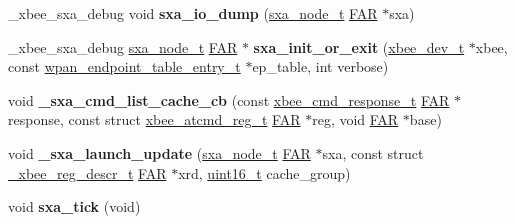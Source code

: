 \begin{DoxyCompactItemize}
\item 
\hypertarget{group___s_x_a_ga698650d3afb6074ef65c9bccf846f471}{\-\_\-xbee\-\_\-sxa\-\_\-debug void {\bfseries sxa\-\_\-io\-\_\-dump} (\hyperlink{structsxa__node__t}{sxa\-\_\-node\-\_\-t} \hyperlink{group__hal_gaef060b3456fdcc093a7210a762d5f2ed}{F\-A\-R} $\ast$sxa)}\label{group___s_x_a_ga698650d3afb6074ef65c9bccf846f471}

\item 
\hypertarget{group___s_x_a_ga20be2a68c0403ec05230526554ffc1ae}{\-\_\-xbee\-\_\-sxa\-\_\-debug \hyperlink{structsxa__node__t}{sxa\-\_\-node\-\_\-t} \hyperlink{group__hal_gaef060b3456fdcc093a7210a762d5f2ed}{F\-A\-R} $\ast$ {\bfseries sxa\-\_\-init\-\_\-or\-\_\-exit} (\hyperlink{structxbee__dev__t}{xbee\-\_\-dev\-\_\-t} $\ast$xbee, const \hyperlink{structwpan__endpoint__table__entry__t}{wpan\-\_\-endpoint\-\_\-table\-\_\-entry\-\_\-t} $\ast$ep\-\_\-table, int verbose)}\label{group___s_x_a_ga20be2a68c0403ec05230526554ffc1ae}

\item 
\hypertarget{group___s_x_a_ga7b3fb6046bd92a9d898403451f524737}{void {\bfseries \-\_\-sxa\-\_\-cmd\-\_\-list\-\_\-cache\-\_\-cb} (const \hyperlink{structxbee__cmd__response__t}{xbee\-\_\-cmd\-\_\-response\-\_\-t} \hyperlink{group__hal_gaef060b3456fdcc093a7210a762d5f2ed}{F\-A\-R} $\ast$response, const struct \hyperlink{structxbee__atcmd__reg__t}{xbee\-\_\-atcmd\-\_\-reg\-\_\-t} \hyperlink{group__hal_gaef060b3456fdcc093a7210a762d5f2ed}{F\-A\-R} $\ast$reg, void \hyperlink{group__hal_gaef060b3456fdcc093a7210a762d5f2ed}{F\-A\-R} $\ast$base)}\label{group___s_x_a_ga7b3fb6046bd92a9d898403451f524737}

\item 
\hypertarget{group___s_x_a_ga81312d0cecb0cac7d7677b0daab1a38a}{void {\bfseries \-\_\-sxa\-\_\-launch\-\_\-update} (\hyperlink{structsxa__node__t}{sxa\-\_\-node\-\_\-t} \hyperlink{group__hal_gaef060b3456fdcc093a7210a762d5f2ed}{F\-A\-R} $\ast$sxa, const struct \hyperlink{struct__xbee__reg__descr__t}{\-\_\-xbee\-\_\-reg\-\_\-descr\-\_\-t} \hyperlink{group__hal_gaef060b3456fdcc093a7210a762d5f2ed}{F\-A\-R} $\ast$xrd, \hyperlink{group__hal_ga5a8b2dc9e45a9ee81a94ef304fb62505}{uint16\-\_\-t} cache\-\_\-group)}\label{group___s_x_a_ga81312d0cecb0cac7d7677b0daab1a38a}

\item 
\hypertarget{group___s_x_a_ga4d338eecde830dfb7301886e30dd8afd}{void {\bfseries sxa\-\_\-tick} (void)}\label{group___s_x_a_ga4d338eecde830dfb7301886e30dd8afd}


\end{DoxyCompactItemize}
